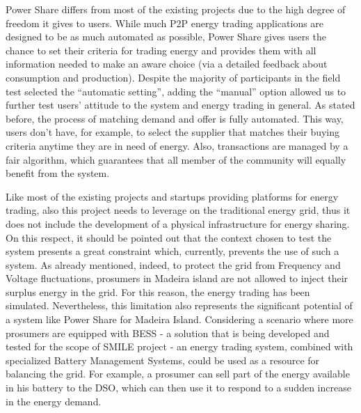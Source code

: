 Power Share differs from most of the existing projects due to the high degree of freedom it gives to users. While much P2P energy trading applications are designed to be as much automated as possible, Power Share gives users the chance to set their criteria for trading energy and provides them with all information needed to make an aware choice (via a detailed feedback about consumption and production). Despite the majority of participants in the field test selected the “automatic setting”, adding the “manual” option allowed us to further test users’ attitude to the system and energy trading in general.
As stated before, the process of matching demand and offer is fully automated. This way, users don’t have, for example, to select the supplier that matches their buying criteria anytime they are in need of energy. Also, transactions are managed by a fair algorithm, which guarantees that all member of the community will equally benefit from the system. 



Like most of the existing projects and startups providing platforms for energy trading, also this project needs to leverage on the traditional energy grid, thus it does not include the development of a physical infrastructure for energy sharing. On this respect, it should be pointed out that the context chosen to test the system presents a great constraint which, currently, prevents the use of such a system. As already mentioned, indeed, to protect the grid from Frequency and Voltage fluctuations, prosumers in Madeira island are not allowed to inject their surplus energy in the grid. For this reason, the energy trading has been simulated. Nevertheless, this limitation also represents the significant potential of a system like Power Share for Madeira Island. Considering a scenario where more prosumers are equipped with \ac{BESS} - a solution that is being developed and tested for the scope of SMILE project - an energy trading system, combined with specialized Battery Management Systems, could be used as a resource for balancing the grid. For example, a prosumer can sell part of the energy available in his battery to the \ac{DSO}, which can then use it to respond to a sudden increase in the energy demand.


